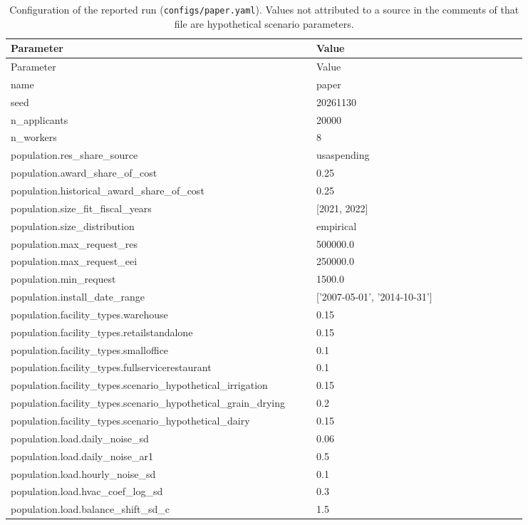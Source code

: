 \begin{longtable}{p{0.55\linewidth}p{0.38\linewidth}}
\caption{Configuration of the reported run (\texttt{configs/paper.yaml}). Values not attributed to a source in the comments of that file are hypothetical scenario parameters.}\label{tab:params}\\
\hline
Parameter & Value \\
\hline
\endfirsthead
\hline
Parameter & Value \\
\hline
\endhead
name & paper \\
seed & 20261130 \\
n\_applicants & 20000 \\
n\_workers & 8 \\
population.res\_share\_source & usaspending \\
population.award\_share\_of\_cost & 0.25 \\
population.historical\_award\_share\_of\_cost & 0.25 \\
population.size\_fit\_fiscal\_years & [2021, 2022] \\
population.size\_distribution & empirical \\
population.max\_request\_res & 500000.0 \\
population.max\_request\_eei & 250000.0 \\
population.min\_request & 1500.0 \\
population.install\_date\_range & ['2007-05-01', '2014-10-31'] \\
population.facility\_types.warehouse & 0.15 \\
population.facility\_types.retailstandalone & 0.15 \\
population.facility\_types.smalloffice & 0.1 \\
population.facility\_types.fullservicerestaurant & 0.1 \\
population.facility\_types.scenario\_hypothetical\_irrigation & 0.15 \\
population.facility\_types.scenario\_hypothetical\_grain\_drying & 0.2 \\
population.facility\_types.scenario\_hypothetical\_dairy & 0.15 \\
population.load.daily\_noise\_sd & 0.06 \\
population.load.daily\_noise\_ar1 & 0.5 \\
population.load.hourly\_noise\_sd & 0.1 \\
population.load.hvac\_coef\_log\_sd & 0.3 \\
population.load.balance\_shift\_sd\_c & 1.5 \\

\end{longtable}
